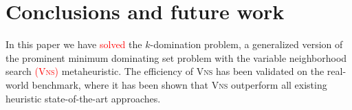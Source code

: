 \documentclass[dvipsnames,format=sigconf]{acmart} %
\begin{document}
\begin{comment}
    
\pgfplotstableread{ %
	City	k1	k2	k4
	Manchester	844.078	1608.695	2584.787
	Nottingham	85.132	1125.304	1827.64
	Belfast	66.681	865.443	1800.359
	Sunderland	44.395	187.461	2464.102
	Leicester	233.02	462.418	1729.272
	Newcastle	88.577	378.578	1147.646
	Leeds	132.67	291.423	1078.052
	Liverpool	192.537	239.716	981.006
	Bristol	129.058	571.793	638.25
	Coventry	144.585	300.407	826.953
	Brighton	89.172	292.017	858.973
	Sheffield	78.21	289.042	850.464
	Plymouth	55.003	205.265	919.927
	Cardiff	41.944	181.9	679.325
	Exeter	52.443	285.106	387.588
	Bath	60.934	256.686	285.744
	Glasgow	90.929	110.067	376.057
	York	28.401	111.923	359.89
	Southampton	7.778	147.781	203.324
	Oxford	18.758	6.93	23.79
}\testdata

\begin{figure}
	\begin{tikzpicture}
		\begin{axis}[
			legend style={legend columns=1,at={(1,1)},anchor=north east},
			xbar stacked,   %
			bar width=5pt,
			ytick=data,     %
			yticklabels from table={\testdata}{City}  %
			]
			\addplot [fill=cyan!20!green!40] table [x=k1, meta=City,y expr=\coordindex] {\testdata};   %
			\addplot [fill=cyan!60!green!20] table [x=k2, meta=City,y expr=\coordindex] {\testdata};
			\addplot [fill=cyan!10] table [x=k4, meta=City,y expr=\coordindex] {\testdata};
			\legend{k=1, k=2,k=4}
		\end{axis}
	\end{tikzpicture}
	\caption{Average times (in seconds) of finding the best solution for small to medium sized instances.}
	\label{fig:timeSmall}  
\end{figure}

\end{comment}

 
\section{Conclusions and future work}

 
 In this paper we have \textcolor{red}{solved} the $k$-domination problem, a generalized version of the prominent minimum dominating set problem with the variable neighborhood search \textcolor{red}{(\textsc{Vns})} metaheuristic. The efficiency of \textsc{Vns} has been validated on the real-world benchmark, where it has been shown that \textsc{Vns} outperform all existing heuristic state-of-the-art approaches. 
 
\end{document}

